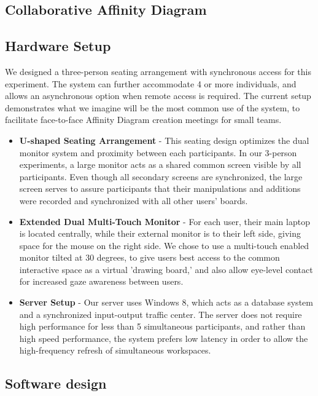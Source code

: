 \documentclass{sigchi}
\begin{document}
\subsection{Collaborative Affinity Diagram}

\subsection{Hardware Setup}

We designed a three-person seating arrangement with synchronous access for this experiment. The system can further accommodate 4 or more individuals, and allows an asynchronous option when remote access is required. The current setup demonstrates what we imagine will be the most common use of the system, to facilitate face-to-face Affinity Diagram creation meetings for small teams. 

\begin{itemize}

\item \textbf{U-shaped Seating Arrangement} - This seating design optimizes the dual monitor system and proximity between each participants. In our 3-person experiments, a large monitor acts as a shared common screen visible by all participants. Even though all secondary screens are synchronized, the large screen serves to assure participants that their manipulations and additions were recorded and synchronized with all other users' boards. 
\item \textbf{Extended Dual Multi-Touch Monitor} - For each user, their main laptop is located centrally, while their external monitor is to their left side, giving space for the mouse on the right side. We chose to use a multi-touch enabled monitor tilted at 30 degrees, to give users best access to the common interactive space as a virtual 'drawing board,' and also allow eye-level contact for increased gaze awareness between users. 
\item \textbf{Server Setup} - Our server uses Windows 8, which acts as a database system and a synchronized input-output traffic center. The server does not require high performance for less than 5 simultaneous participants, and rather than high speed performance, the system prefers low latency in order to allow the high-frequency refresh of simultaneous workspaces.
\end{itemize}

\subsection{Software design}
\end{document}
